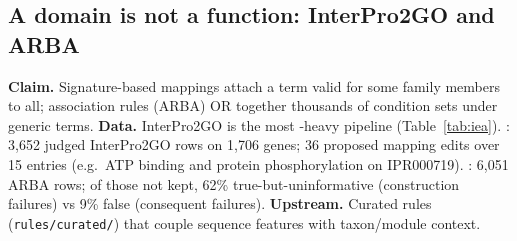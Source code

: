 \subsection{A domain is not a function: InterPro2GO and ARBA}\label{sec:dd-domain}
\textbf{Claim.} Signature-based mappings attach a term valid for some family members to all;
association rules (ARBA) OR together thousands of condition sets under generic terms.
\textbf{Data.} InterPro2GO is the most -heavy pipeline (Table~\ref{tab:iea}).
: 3,652 judged InterPro2GO rows on 1,706 genes; 36 proposed mapping edits over
15 entries (e.g.\ ATP binding and protein phosphorylation on IPR000719).
: 6,051 ARBA rows; of those not kept, 62\% true-but-uninformative
(construction failures) vs 9\% false (consequent failures).
\textbf{Upstream.} Curated rules (\texttt{rules/curated/}) that couple sequence features with
taxon/module context. 
